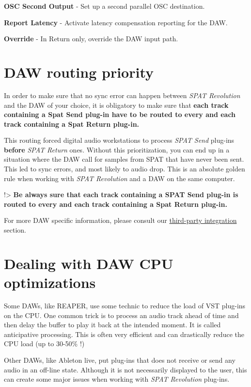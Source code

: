\documentclass[
  letterpaper,
  DIV=11,
  numbers=noendperiod]{scrreport}
\begin{document}
\textbf{OSC Second Output} - Set up a second parallel OSC destination.

\textbf{Report Latency} - Activate latency compensation reporting for
the DAW.

\textbf{Override} - In Return only, override the DAW input path.

\hypertarget{daw-routing-priority}{%
\section{DAW routing priority}\label{daw-routing-priority}}

In order to make sure that no sync error can happen between \emph{SPAT
Revolution} and the DAW of your choice, it is obligatory to make sure
that \textbf{each track containing a Spat Send plug-in have to be routed
to every and each track containing a Spat Return plug-in.}

This routing forced digital audio workstations to process \emph{SPAT
Send} plug-ins \textbf{before} \emph{SPAT Return} ones. Without this
prioritization, you can end up in a situation where the DAW call for
samples from SPAT that have never been sent. This led to sync errors,
and most likely to audio drop. This is an absolute golden rule when
working with \emph{SPAT Revolution} and a DAW on the same computer.

!\textgreater{} \textbf{Be always sure that each track containing a SPAT
Send plug-in is routed to every and each track containing a Spat Return
plug-in.}

For more DAW specific information, please consult our
\href{Third_Party_Integration.md}{third-party integration} section.

\hypertarget{dealing-with-daw-cpu-optimizations}{%
\section{Dealing with DAW CPU
optimizations}\label{dealing-with-daw-cpu-optimizations}}

Some DAWs, like REAPER, use some technic to reduce the load of VST
plug-ins on the CPU. One common trick is to process an audio track ahead
of time and then delay the buffer to play it back at the intended
moment. It is called anticipative processing. This is often very
efficient and can drastically reduce the CPU load (up to 30-50\% !)

Other DAWs, like Ableton live, put plug-ins that does not receive or
send any audio in an off-line state. Although it is not necessarily
displayed to the user, this can create some major issues when working
with \emph{SPAT Revolution} plug-ins.
\end{document}
